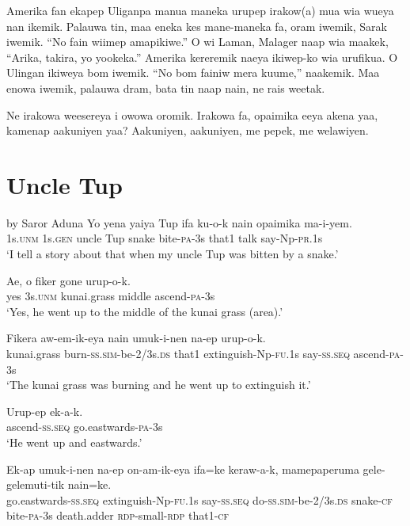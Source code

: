 Amerika  fan  ekapep  Uliganpa  manua  maneka   urupep  irakow(a)  mua  wia  wueya  nan  ikemik. 
Palauwa  tin,  maa  eneka  kes  mane-maneka  fa,  oram  iwemik,  Sarak  iwemik. 
“No  fain  wiimep  amapikiwe.” 
O  wi  Laman,  Malager  naap  wia  maakek, “Arika,  takira,  yo  yookeka.” 
Amerika  kereremik  naeya  ikiwep-ko  wia  urufikua. 
O  Ulingan  ikiweya  bom  iwemik. 
“No  bom  fainiw  mera  kuume,”  naakemik. 
Maa  enowa  iwemik,  palauwa  dram,    bata  tin  naap  nain,  ne  rais  weetak. 

Ne  irakowa  weesereya  i  owowa  oromik. 
Irakowa  fa,  opaimika  eeya  akena  yaa,  kamenap  aakuniyen  yaa? 
Aakuniyen,  aakuniyen,  me  pepek,  me  welawiyen. 

\section{Uncle Tup}\label{app:2:uncle}
by Saror Aduna
\ea
\gll  Yo  yena  yaiya  Tup  ifa  ku-o-k  nain  opaimika     ma-i-yem. \\
1s.\textsc{unm}  1s.\textsc{gen}  uncle  Tup  snake  bite-\textsc{pa}-3s  that1  talk  say-Np-\textsc{pr}.1s \\
\glt ‘I tell a story about that when my uncle Tup was bitten by a snake.’ \\
\z


\ea
\gll  Ae,  o  fiker  gone  urup-o-k. \\
yes  3s.\textsc{unm}  kunai.grass  middle  ascend-\textsc{pa}-3s \\
\glt ‘Yes, he went up to the middle of the kunai grass (area).’ \\
\z


\ea
\gll  Fikera  aw-em-ik-eya  nain  umuk-i-nen                       na-ep  urup-o-k. \\
kunai.grass  burn-\textsc{ss}.\textsc{sim}-be-2/3s.\textsc{ds}  that1  extinguish-Np-\textsc{fu}.1s    say-\textsc{ss.seq}  ascend-\textsc{pa}-3s \\
\glt ‘The kunai grass was burning and he went up to extinguish it.’ \\
\z


\ea
\gll  Urup-ep  ek-a-k. \\
ascend-\textsc{ss.seq}  go.eastwards-\textsc{pa}-3s \\
\glt ‘He went up and eastwards.’ \\
\z


\ea
\gll  Ek-ap  umuk-i-nen  na-ep                        on-am-ik-eya  ifa=ke  keraw-a-k,  mamepaperuma             gele-gelemuti-tik  nain=ke. \\
go.eastwards-\textsc{ss.seq}  extinguish-Np-\textsc{fu}.1s  say-\textsc{ss.seq}  do-\textsc{ss}.\textsc{sim}-be-2/3s.\textsc{ds}  snake-\textsc{cf}  bite-\textsc{pa}-3s  death.adder    \textsc{rdp}-small-\textsc{rdp}  that1-\textsc{cf} \\




